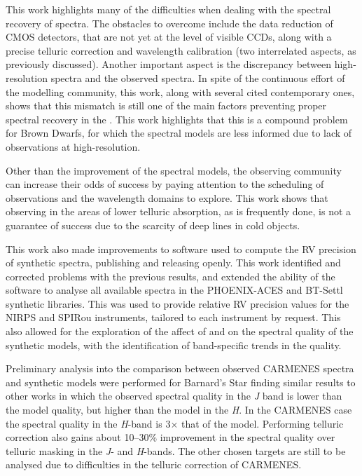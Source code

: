 This work highlights many of the difficulties when dealing with the spectral recovery of \nir{} spectra.
The obstacles to overcome include the data reduction of \nir{} CMOS detectors, that are not yet at the level of visible CCDs, along with a precise telluric correction and wavelength calibration (two interrelated aspects, as previously discussed).
Another important aspect is the discrepancy between \nir{} high-resolution spectra and the observed spectra.
In spite of the continuous effort of the modelling community, this work, along with several cited contemporary ones, shows that this mismatch is still one of the main factors preventing proper spectral recovery in the \nir{}.
This work highlights that this is a compound problem for Brown Dwarfs, for which the spectral models are less informed due to lack of observations at high-resolution.

Other than the improvement of the spectral models, the observing community can increase their odds of success by paying attention to the scheduling of observations and the wavelength domains to explore.
This work shows that observing in the areas of lower telluric absorption, as is frequently done, is not a guarantee of success due to the scarcity of deep lines in cold objects.

This work also made improvements to software used to compute the {RV} precision of synthetic spectra, publishing and releasing \eniric{} openly.
This work identified and corrected problems with the previous results, and extended the ability of the software to analyse all available spectra in the {PHOENIX-ACES} and {BT-Settl} synthetic libraries.
This was used to provide relative {RV} precision values for the {NIRPS} and {SPIRou} instruments, tailored to each instrument by request.
This also allowed for the exploration of the affect of \Logg{} and \feh{} on the spectral quality of the synthetic models, with the identification of band-specific trends in the quality.

Preliminary analysis into the comparison between observed {CARMENES} spectra and synthetic models were performed for Barnard's Star finding similar results to other works in which the observed spectral quality in the \emph{J} band is lower than the model quality, but higher than the model in the \emph{H}.
In the CARMENES case the spectral quality in the \emph{H}-band is 3\(\times\) that of the model.
Performing telluric correction also gains about 10--30\% improvement in the spectral quality over telluric masking in the \emph{J}- and \emph{H}-bands.
The other chosen targets are still to be analysed due to difficulties in the telluric correction of {CARMENES}.


